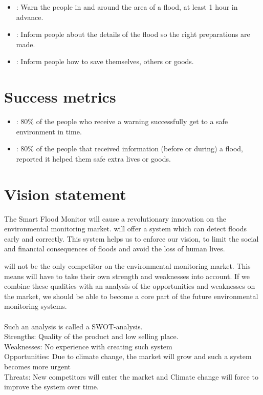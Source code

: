 \begin{itemize}
	\item {}: Warn the people in and around the area of a flood, at least 1 hour in advance.
	\item {}: Inform people about the details of the flood so the right preparations are made. 
	\item {}: Inform people how to save themselves, others or goods.
\end{itemize}

\section{Success metrics}
\begin{itemize}
	\item {}: 80\% of the people who receive a warning successfully get to a safe environment in time.
	\item {}: 80\% of the people that received information (before or during) a flood, reported it helped them safe extra lives or goods.
\end{itemize}

\section{Vision statement}
The Smart Flood Monitor will cause a revolutionary innovation on the environmental monitoring market. \CompanyName will offer a system which can detect floods early and correctly. This system helps us to enforce our vision, to limit the social and financial consequences of floods and avoid the loss of human lives. 

\CompanyName will not be the only competitor on the environmental monitoring market. This means \CompanyName will have to take their own strength and weaknesses into account. If we combine these qualities with an analysis of the opportunities and weaknesses on the market, we should be able to become a core part of the future environmental monitoring systems.\\\\

Such an analysis is called a SWOT-analysis. 
\\
Strengths: Quality of the product and low selling place.\\ 
Weaknesses: No experience with creating such system\\
Opportunities: Due to climate change, the market will grow and such a system becomes more urgent \\
Threats: New competitors will enter the market and Climate change will force to improve the system over time. \\\\

